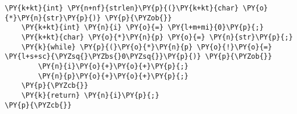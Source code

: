 \begin{Verbatim}[commandchars=\\\{\}]
\PY{k+kt}{int} \PY{n+nf}{strlen}\PY{p}{(}\PY{k+kt}{char} \PY{o}{*}\PY{n}{str}\PY{p}{)} \PY{p}{\PYZob{}}
    \PY{k+kt}{int} \PY{n}{i} \PY{o}{=} \PY{l+m+mi}{0}\PY{p}{;}
    \PY{k+kt}{char} \PY{o}{*}\PY{n}{p} \PY{o}{=} \PY{n}{str}\PY{p}{;}
    \PY{k}{while} \PY{p}{(}\PY{o}{*}\PY{n}{p} \PY{o}{!}\PY{o}{=} \PY{l+s+sc}{\PYZsq{}\PYZbs{}0\PYZsq{}}\PY{p}{)} \PY{p}{\PYZob{}}
        \PY{n}{i}\PY{o}{+}\PY{o}{+}\PY{p}{;}
        \PY{n}{p}\PY{o}{+}\PY{o}{+}\PY{p}{;}
    \PY{p}{\PYZcb{}}
    \PY{k}{return} \PY{n}{i}\PY{p}{;}
\PY{p}{\PYZcb{}}
\end{Verbatim}
